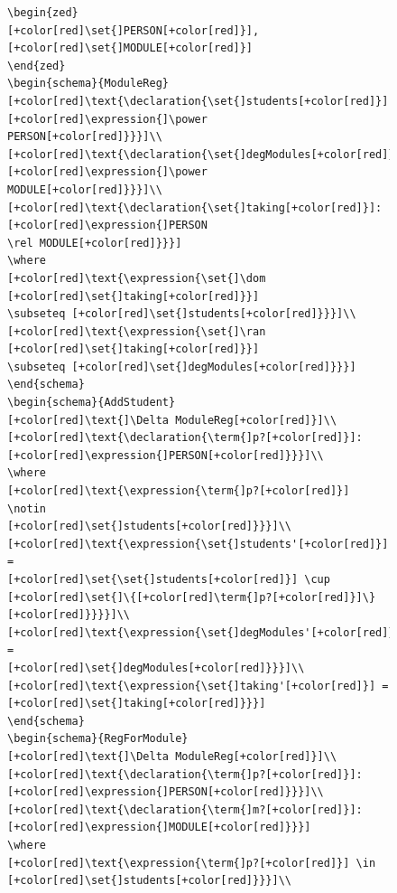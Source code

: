 \begin{figure}[H]
\begin{minipage}{0.45\textwidth}
\begin{tiny}
\begin{BVerbatim}[commandchars=+\[\]]
\begin{zed}
[+color[red]\set{]PERSON[+color[red]}], [+color[red]\set{]MODULE[+color[red]}]
\end{zed}
\begin{schema}{ModuleReg}
[+color[red]\text{\declaration{\set{]students[+color[red]}]:[+color[red]\expression{]\power
PERSON[+color[red]}}}]\\
[+color[red]\text{\declaration{\set{]degModules[+color[red]}]:[+color[red]\expression{]\power
MODULE[+color[red]}}}]\\
[+color[red]\text{\declaration{\set{]taking[+color[red]}]:[+color[red]\expression{]PERSON
\rel MODULE[+color[red]}}}]
\where
[+color[red]\text{\expression{\set{]\dom [+color[red]\set{]taking[+color[red]}}]
\subseteq [+color[red]\set{]students[+color[red]}}}]\\
[+color[red]\text{\expression{\set{]\ran [+color[red]\set{]taking[+color[red]}}]
\subseteq [+color[red]\set{]degModules[+color[red]}}}]
\end{schema}
\begin{schema}{AddStudent}
[+color[red]\text{]\Delta ModuleReg[+color[red]}]\\
[+color[red]\text{\declaration{\term{]p?[+color[red]}]:[+color[red]\expression{]PERSON[+color[red]}}}]\\
\where
[+color[red]\text{\expression{\term{]p?[+color[red]}] \notin
[+color[red]\set{]students[+color[red]}}}]\\
[+color[red]\text{\expression{\set{]students'[+color[red]}] =
[+color[red]\set{\set{]students[+color[red]}] \cup
[+color[red]\set{]\{[+color[red]\term{]p?[+color[red]}]\}[+color[red]}}}}]\\
[+color[red]\text{\expression{\set{]degModules'[+color[red]}] =
[+color[red]\set{]degModules[+color[red]}}}]\\
[+color[red]\text{\expression{\set{]taking'[+color[red]}] =
[+color[red]\set{]taking[+color[red]}}}]
\end{schema}
\begin{schema}{RegForModule}
[+color[red]\text{]\Delta ModuleReg[+color[red]}]\\
[+color[red]\text{\declaration{\term{]p?[+color[red]}]:
[+color[red]\expression{]PERSON[+color[red]}}}]\\
[+color[red]\text{\declaration{\term{]m?[+color[red]}]:
[+color[red]\expression{]MODULE[+color[red]}}}]
\where
[+color[red]\text{\expression{\term{]p?[+color[red]}] \in
[+color[red]\set{]students[+color[red]}}}]\\

\end{BVerbatim}
\end{tiny}
\end{minipage}
\end{figure}
